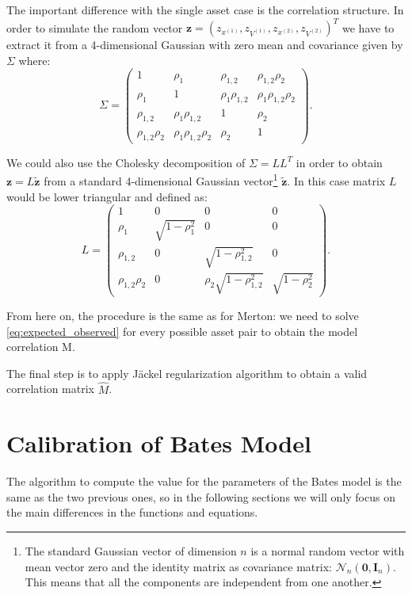 The important difference with the single asset case is the correlation structure. In order to simulate the random vector $\mathbf{z} = (z_{x^{(1)}}, z_{V^{(1)}}, z_{x^{(2)}}, z_{V^{(2)}})^T$ we have to extract it from a 4-dimensional Gaussian with zero mean and covariance given by $\Sigma$ where:
\begin{equation}
\label{eq:corr_matrix}
	\Sigma = \begin{pmatrix}
	1 	& \rho_1 & \rho_{1,2} & \rho_{1,2} \rho_2\\
	\rho_1 & 1 & \rho_1 \rho_{1,2} & \rho_1 \rho_{1,2} \rho_2\\
	 \rho_{1,2} & \rho_1 \rho_{1,2}  & 1 & \rho_2 \\
	 \rho_{1,2} \rho_2 & \rho_1 \rho_{1,2} \rho_2&\rho_2  & 1
	\end{pmatrix}.
\end{equation}

We could also use the Cholesky decomposition of $\Sigma = L L^T$ in order to obtain $\mathbf{z} = L \mathbf{\tilde{z}}$ from a standard 4-dimensional Gaussian vector\footnote{The standard Gaussian vector of dimension $n$ is a normal random vector with mean vector zero and the identity matrix as covariance matrix: $\mathcal{N}_n (\mathbf{0}, \mathbf{I}_n)$. This means that all the components are independent from one another.} $\mathbf{\tilde{z}}$. In this case matrix $L$ would be lower triangular and defined as:
\begin{equation}
	L = \begin{pmatrix}
	1&0&0&0\\
	\rho_1 & \sqrt{1- \rho_1^2} &0&0\\
	\rho_{1,2} &0&\sqrt{1-\rho_{1,2}^2}&0\\
	\rho_{1,2}\rho_2 & 0& \rho_2 \sqrt{1-\rho_{1,2}^2}&\sqrt{1- \rho_2^2} 
	\end{pmatrix}.
\end{equation}

From here on, the procedure is the same as for Merton:
we need to solve \eqref{eq:expected_observed} for every possible asset pair to obtain the model correlation M.

The final step is to apply  J\"ackel regularization algorithm to obtain a valid correlation matrix $\widehat{M}$.

\bigskip
\section{Calibration of Bates Model}
\label{sec:bates_cal}
The algorithm to compute the value for the parameters of the Bates model is the same as the two previous ones, so in the following sections we will only focus on the main differences in the functions and equations.

